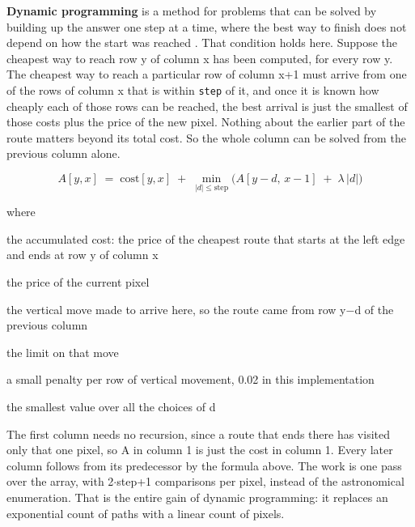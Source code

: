 \textbf{Dynamic programming} is a method for problems that can be solved by building up the answer one step at a time, where the best way to finish does not depend on how the start was reached \cite{bellman1954}. That condition holds here. Suppose the cheapest way to reach row y of column x has been computed, for every row y. The cheapest way to reach a particular row of column x+1 must arrive from one of the rows of column x that is within \texttt{step} of it, and once it is known how cheaply each of those rows can be reached, the best arrival is just the smallest of those costs plus the price of the new pixel. Nothing about the earlier part of the route matters beyond its total cost. So the whole column can be solved from the previous column alone.


\begin{equation}
A[y,x] \;=\; \mathrm{cost}[y,x] \;+\; \min_{|d| \le \mathrm{step}} \Big( A[y-d,\,x-1] \;+\; \lambda\,|d| \Big)
\end{equation}

\noindent where
\begin{description}[leftmargin=2.4em,style=nextline,font=\normalfont\ttfamily]\setlength\itemsep{1pt}
  \item[{$A[y,x]$}] \normalfont the accumulated cost: the price of the cheapest route that starts at the left edge and ends at row y of column x
  \item[{$\mathrm{cost}[y,x]$}] \normalfont the price of the current pixel
  \item[{$d$}] \normalfont the vertical move made to arrive here, so the route came from row y$-$d of the previous column
  \item[{$\mathrm{step}$}] \normalfont the limit on that move
  \item[{$\lambda$}] \normalfont a small penalty per row of vertical movement, 0.02 in this implementation
  \item[{$\min$}] \normalfont the smallest value over all the choices of d
\end{description}
The first column needs no recursion, since a route that ends there has visited only that one pixel, so A in column 1 is just the cost in column 1. Every later column follows from its predecessor by the formula above. The work is one pass over the array, with 2$\cdot$step+1 comparisons per pixel, instead of the astronomical enumeration. That is the entire gain of dynamic programming: it replaces an exponential count of paths with a linear count of pixels.


